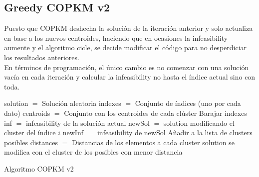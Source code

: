 \newpage


\subsection{Greedy COPKM v2}

Puesto que COPKM deshecha la solución de la iteración anterior y solo actualiza en base a los nuevos centroides, haciendo que en ocasiones la infeasibility aumente y el algoritmo cicle, se decide modificar el código para no desperdiciar los resultados anteriores. \\

En términos de programación, el único cambio es no comenzar con una solución vacía en cada iteración y calcular la infeasibility no hasta el índice actual sino con toda. \\

\begin{algorithm}[H]
    \SetAlgoLined
        solution $=$ Solución aleatoria \;
        indexes $=$ Conjunto de índices (uno por cada dato) \;
        centroids $=$ Conjunto con los centroides de cada clúster \;
        Barajar indexes \;
         {
             {
                inf $=$ infeasibility de la solución actual \;
                 {
                    newSol $=$ solution modificando el cluster del índice $i$ \;
                    newInf $=$ infeasibility de newSol \;
                     {
                        Añadir a la lista de clusters posibles \;
                    }
                }
                distances $=$ Distancias de los elementos a cada cluster \;
                solution se modifica con el cluster de los posibles con menor distancia \; 
            }
        }
    \caption{Algoritmo COPKM v2}
\end{algorithm}

\newpage



